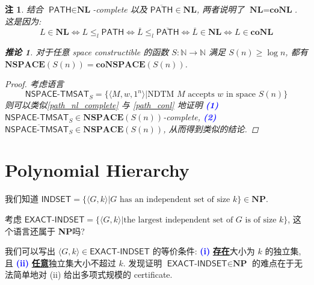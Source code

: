 \documentclass[8pt]{article}
\theoremstyle{compact}
\newtheorem{corollary}[theorem]{推论}
\newtheorem{remark}[theorem]{注}
\def\obj#1{\textbf{\uline{#1}}}
\def\num#1{\textnormal{\textbf{\mbox{\textcolor{blue}{(#1)}}}}}
\def\le{\leqslant}
\def\ge{\geqslant}
\def\NP{\textbf{NP}}
\def\NSPACE{\textbf{NSPACE}}
\def\NL{\textbf{NL}}
\def\coNL{\textbf{coNL}}
\begin{document}
\begin{remark}
	结合 $\textsf{PATH} \in \NL$-complete 以及 $\overline{\textsf{PATH}} \in \NL$, 两者说明了 $\NL = \coNL$. 这是因为: $$L \in \NL \Leftrightarrow L \le_l \textsf{PATH} \Leftrightarrow \overline{L} \le_l \overline{\textsf{PATH}} \Leftrightarrow \overline{L} \in \NL \Leftrightarrow L \in \coNL$$

	
	\begin{corollary}
		对于任意 space constructible 的函数 $S : \mathbb N \to \mathbb N$ 满足 $S(n) \ge \log n$, 都有 $\NSPACE(S(n)) = \textbf{coNSPACE}(S(n))$.
	\end{corollary}
	\begin{proof}
		考虑语言 $$\textsf{NSPACE-TMSAT}_S = \{\langle M, w, 1^n \rangle | \text{NDTM } M \text{ accepts } w \text{ in space } S(n)\}$$
		则可以类似\cref{path_nl_complete} 与 \cref{path_conl} 地证明 \num{1} $\textsf{NSPACE-TMSAT}_S \in \NSPACE(S(n))$-complete, \num{2} $\overline{\textsf{NSPACE-TMSAT}_S} \in \NSPACE(S(n))$, 从而得到类似的结论.
	\end{proof}
\end{remark}



\newpage
\section{Polynomial Hierarchy}

我们知道 $\textsf{INDSET} = \{\langle G, k \rangle | G \text{ has an independent set of size } k\} \in \NP$. 

考虑 $\textsf{EXACT-INDSET} = \{\langle G, k \rangle | \text{the largest independent set of } G \text{ is of size } k\}$, 这个语言还属于 \NP 吗?

我们可以写出 $\langle G, k \rangle \in \textsf{EXACT-INDSET}$ 的等价条件: \num{i} \obj{存在}大小为 $k$ 的独立集, 且 \num{ii} \obj{任意}独立集大小不超过 $k$. 发现证明 $\textsf{EXACT-INDSET} \in \NP$ 的难点在于无法简单地对 (ii) 给出多项式规模的 certificate.
\end{document}
